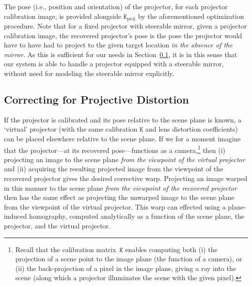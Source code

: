 \documentclass[review]{elsarticle}
\begin{document}
The pose (i.e., position and orientation) of the projector, for each projector calibration image, is provided alongside $\mathtt{K}_\text{proj}$ by the aforementioned optimization procedure. Note that for a fixed projector with steerable mirror, given a projector calibration image, the recovered projector's pose is the pose the projector would have to have had to project to the given target location \textit{in the absence of the mirror}. As this is sufficient for our needs in Section~\ref{sec:approach:homography}, it is in this sense that our system is able to handle a projector equipped with a steerable mirror, without need for modeling the steerable mirror explicitly.


\subsection{Correcting for Projective Distortion}\label{sec:approach:homography}

If the projector is calibrated and its pose relative to the scene plane is known, a `virtual' projector (with the same calibration $\mathtt{K}$ and lens distortion coefficients) can be placed elsewhere relative to the scene plane. If we for a moment imagine that the projector---at its recovered pose---functions as a camera,\footnote{Recall that the calibration matrix~$\mathtt{K}$ enables computing both (i) the projection of a scene point to the image plane (the function of a camera), or (ii) the back-projection of a pixel in the image plane, giving a ray into the scene (along which a projector illuminates the scene with the given pixel).} then (i) projecting an image to the scene plane \textit{from the viewpoint of the virtual projector} and (ii) acquiring the resulting projected image from the viewpoint of the recovered projector gives the desired corrective warp. Projecting an image warped in this manner to the scene plane \textit{from the viewpoint of the recovered projector} then has the same effect as projecting the unwarped image to the scene plane from the viewpoint of the virtual projector. This warp can effected using a plane-induced homography, computed analytically as a function of the scene plane, the projector, and the virtual projector.
\end{document}
